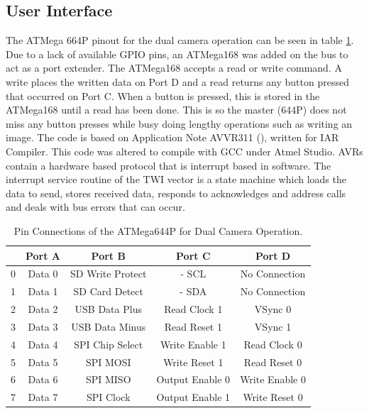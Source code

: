 \subsection{User Interface}
The ATMega 664P pinout for the dual camera operation can be seen in table \ref{table:644Pin}. Due to a lack of available GPIO pins, an ATMega168 was added on the \itc bus to act as a port extender. The ATMega168 accepts a read or write command. A write places the written data on Port D and a read returns any button pressed that occurred on Port C. When a button is pressed, this is stored in the ATMega168 until a read has been done. This is so the master (644P) does not miss any button presses while busy doing lengthy operations such as writing an image. The code is based on Application Note AVVR311 (\cite{Atmel:I2CSlave}), written for IAR Compiler. This code was altered to compile with GCC under Atmel Studio. AVRs contain a hardware based \itc protocol that is interrupt based in software. The interrupt service routine of the TWI vector is a state machine which loads the data to send, stores received data, responds to acknowledges and address calls and deals with bus errors that can occur.

\begin{table}
\centering
\begin{tabular}{|c|c|c|c|c|}\hline
	& 	Port A 	& 	Port B 			& 	Port C 				& 	Port D 		\\ \hline
0	&	Data 0	&	SD Write Protect&	\itc - SCL			&	No Connection	\\
1	&	Data 1	&	SD Card Detect	&	\itc - SDA			&	No Connection	\\
2	&	Data 2	&	USB Data Plus	&	Read Clock 1		&	VSync 0			\\
3	&	Data 3	&	USB Data Minus	&	Read Reset 1		&	VSync 1			\\
4	&	Data 4	&	SPI Chip Select	&	Write Enable 1		&	Read Clock 0	\\
5	&	Data 5	&	SPI	MOSI 		&	Write Reset 1		&	Read Reset 0	\\
6	&	Data 6	&	SPI MISO		&	Output Enable 0		&	Write Enable 0	\\
7	&	Data 7	&	SPI Clock		&	Output Enable 1		&	Write Reset 0	\\
\hline

\end{tabular}
\caption{Pin Connections of the ATMega644P for Dual Camera Operation.}
\label{table:644Pin}
\end{table}
